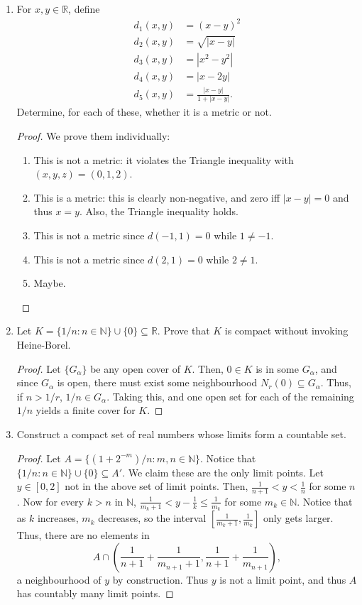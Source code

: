 \documentclass{scrbook}
\newcommand{\N}{\mathbb{N}}
\newcommand{\R}{\mathbb{R}}
\begin{document}
\begin{enumerate}
\item %
For $x, y \in \R$, define
\begin{align*}
	d_1(x, y) &= (x - y)^2 \\
	d_2(x, y) &= \sqrt{|x - y|} \\
	d_3(x, y) &= |x^2 - y^2| \\
	d_4(x, y) &= |x - 2y| \\
	d_5(x, y) &= \frac{|x - y|}{1 + |x - y|}.
\end{align*}
Determine, for each of these, whether it is a metric or not.

\begin{proof}
We prove them individually:
\begin{enumerate}[${d}_1(x, y)$:]
\item This is not a metric: it violates the Triangle inequality with $(x, y, z) = (0, 1, 2)$.
\item This is a metric: this is clearly non-negative, and zero iff $|x - y| = 0$ and thus $x = y$. Also, the Triangle inequality holds.
\item This is not a metric since $d(-1, 1) = 0$ while $1 \ne -1$.
\item This is not a metric since $d(2, 1) = 0$ while $2 \ne 1$.
\item Maybe.
\end{enumerate}
\end{proof}

\item %
Let $K = \{1/n : n \in \N\} \cup \{0\} \subseteq \R$. Prove that $K$ is compact without invoking Heine-Borel.

\begin{proof}
Let $\{G_\alpha\}$ be any open cover of $K$. Then, $0 \in K$ is in some $G_\alpha$, and since $G_\alpha$ is open, there must exist some neighbourhood $N_r(0) \subseteq G_\alpha$. Thus, if $n > 1/r$, $1/n \in G_\alpha$. Taking this, and one open set for each of the remaining $1/n$ yields a finite cover for $K$.
\end{proof}

\item %
Construct a compact set of real numbers whose limits form a countable set.

\begin{proof}
Let $A = \{(1 + 2^{-m}) / n: m, n \in \N\}$. Notice that $\{1/n : n \in \N\} \cup \{0\} \subseteq A'$. We claim these are the only limit points. Let $y \in [0, 2]$ not in the above set of limit points. Then, $\frac{1}{n + 1} < y < \frac{1}{n}$ for some $n$. Now for every $k > n$ in $\N$, $\frac{1}{m_k + 1} < y - \frac{1}{k} \le \frac{1}{m_k}$ for some $m_k \in \N$. Notice that as $k$ increases, $m_k$ decreases, so the interval $\left[\frac{1}{m_k + 1}, \frac{1}{m_k}\right]$ only gets larger. Thus, there are no elements in 
\[
	A \cap \left( \frac{1}{n + 1} + \frac{1}{m_{n+1} + 1}, \frac{1}{n + 1} + \frac{1}{m_{n+1}} \right), 
\]
a neighbourhood of $y$ by construction. Thus $y$ is not a limit point, and thus $A$ has countably many limit points. 
\end{proof}


\end{enumerate}
\end{document}
